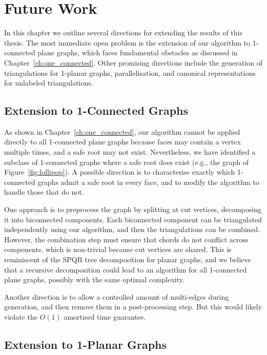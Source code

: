 
\chapter{Future Work}
\label{ch:future_work}

In this chapter we outline several directions for extending the results of this thesis. 
The most immediate open problem is the extension of our algorithm to 1-connected plane graphs, which faces fundamental obstacles as discussed in Chapter~\ref{ch:one_connected}. 
Other promising directions include the generation of triangulations for 1-planar graphs, parallelisation, and canonical representations for unlabeled triangulations.

\section{Extension to 1-Connected Graphs}
\label{sec:future_1connected}

As shown in Chapter~\ref{ch:one_connected}, our algorithm cannot be applied directly to all 1-connected plane graphs because faces may contain a vertex multiple times, and a safe root may not exist. 
Nevertheless, we have identified a subclass of 1-connected graphs where a safe root does exist (e.g., the graph of Figure~\ref{fig:lollipop}). 
A possible direction is to characterise exactly which 1-connected graphs admit a safe root in every face, and to modify the algorithm to handle those that do not.

One approach is to preprocess the graph by splitting at cut vertices, decomposing it into biconnected components. 
Each biconnected component can be triangulated independently using our algorithm, and then the triangulations can be combined. 
However, the combination step must ensure that chords do not conflict across components, which is non-trivial because cut vertices are shared. 
This is reminiscent of the SPQR tree decomposition for planar graphs, and we believe that a recursive decomposition could lead to an algorithm for all 1-connected plane graphs, possibly with the same optimal complexity.

Another direction is to allow a controlled amount of multi-edges during generation, and then remove them in a post-processing step. 
But this would likely violate the \(O(1)\) amortised time guarantee.

\section{Extension to 1-Planar Graphs}
\label{sec:future_1planar}

